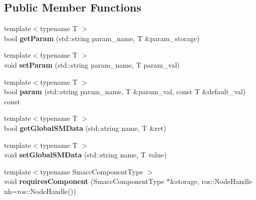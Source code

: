 \subsection*{Public Member Functions}
\begin{DoxyCompactItemize}
\item 
\mbox{\label{classsmacc_1_1SmaccState_aa5f455c4336d18ce25a4e0f42a5b122b}} 
{\footnotesize template$<$typename T $>$ }\\bool {\bfseries get\+Param} (std\+::string param\+\_\+name, T \&param\+\_\+storage)
\item 
\mbox{\label{classsmacc_1_1SmaccState_ab554e83f5d07ce4efe53d8bcaeb0693a}} 
{\footnotesize template$<$typename T $>$ }\\void {\bfseries set\+Param} (std\+::string param\+\_\+name, T param\+\_\+val)
\item 
\mbox{\label{classsmacc_1_1SmaccState_ae699b27331be77615f54144e545af9bc}} 
{\footnotesize template$<$typename T $>$ }\\bool {\bfseries param} (std\+::string param\+\_\+name, T \&param\+\_\+val, const T \&default\+\_\+val) const
\item 
\mbox{\label{classsmacc_1_1SmaccState_ad53b5be2760eb7ffb50f3b2e542b65f1}} 
{\footnotesize template$<$typename T $>$ }\\bool {\bfseries get\+Global\+S\+M\+Data} (std\+::string name, T \&ret)
\item 
\mbox{\label{classsmacc_1_1SmaccState_a98f2673b257479e0a3615d5d8279a591}} 
{\footnotesize template$<$typename T $>$ }\\void {\bfseries set\+Global\+S\+M\+Data} (std\+::string name, T value)
\item 
\mbox{\label{classsmacc_1_1SmaccState_a880a01f691136de365749c2e035d5127}} 
{\footnotesize template$<$typename Smacc\+Component\+Type $>$ }\\void {\bfseries requires\+Component} (Smacc\+Component\+Type $\ast$\&storage, ros\+::\+Node\+Handle nh=ros\+::\+Node\+Handle())
\item 
\mbox{\label{classsmacc_1_1SmaccState_adc225018fe91da47e6e9f1d20150b26a}} 

\end{DoxyCompactItemize}
